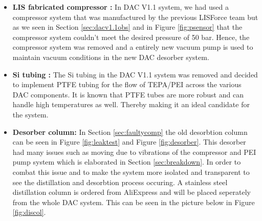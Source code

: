 \begin{itemize}
    \item \textbf{LIS fabricated compressor :} In DAC V1.1 system, we had used a compressor system that was manufactured by the previous LISForce team but as we seen in Section \ref{sec:dacv1.1obs} and in Figure \ref{fig:psensor} that the compressor system couldn't meet the desired pressure of 50 bar. Hence, the compressor system was removed and a entirely new vacuum pump is used to maintain vacuum conditions in the new DAC desorber system. 
    
    \item \textbf{Si tubing :} The Si tubing in the DAC V1.1 system was removed and decided to implement PTFE tubing for the flow of TEPA/PEI across the various DAC components. It is known that PTFE tubes are more robust and can handle high temperatures as well. Thereby making it an ideal candidate for the system. 
    
    \item \textbf{Desorber column:} In Section \ref{sec:faultycomp} the old desorbtion column can be seen in Figure \ref{fig:leaktest} and Figure \ref{fig:desorber}. This desorber had many issues such as moving due to vibrations of the compressor and PEI pump system which is elaborated in Section \ref{sec:breakdown}. In order to combat this issue and to make the system more isolated and transparent to see the distillation and desorbtion process occuring. A stainless steel distillation column is ordered from AliExpress and will be placed seperately from the whole DAC system. This can be seen in the picture below in Figure \ref{fig:discol}.
    

\end{itemize}
